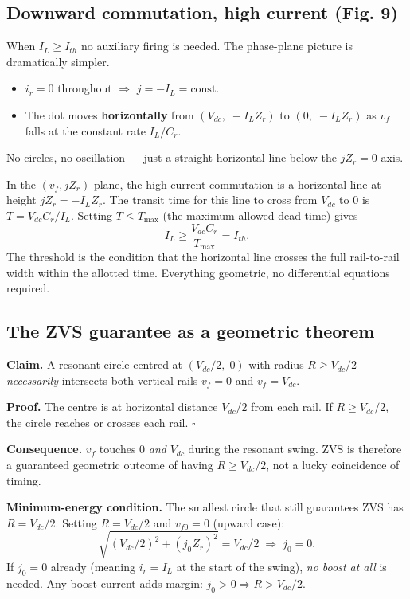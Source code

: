 \documentclass[12pt, a4paper]{article}
\def\,{ }%
\newcommand{\Vdc}{V_{dc}}
\newcommand{\ir}{i_r}
\newcommand{\IL}{I_L}
\newcommand{\Ith}{I_{th}}
\begin{document}
\subsection{Downward commutation, high current (Fig.\,9)}
\label{ssec:pp_fig9}

When $\IL \geq \Ith$ no auxiliary firing is needed.
The phase-plane picture is dramatically simpler.

\begin{itemize}
    \item $\ir = 0$ throughout $\Rightarrow$ $j = -\IL = \text{const}$.
    \item The dot moves \textbf{horizontally} from $(\Vdc,\; -\IL Z_r)$
          to $(0,\; -\IL Z_r)$ as $v_f$ falls at the constant rate
          $\IL/C_r$.
\end{itemize}

No circles, no oscillation --- just a straight horizontal line below the
$jZ_r = 0$ axis.

\begin{physbox}
In the $(v_f, jZ_r)$ plane, the high-current commutation is a horizontal
line at height $jZ_r = -\IL Z_r$.
The transit time for this line to cross from $\Vdc$ to $0$ is
$T = \Vdc C_r / \IL$.
Setting $T \leq T_\text{max}$ (the maximum allowed dead time) gives
\[
    \IL \geq \frac{\Vdc\,C_r}{T_\text{max}} = \Ith.
\]
The threshold is the condition that the horizontal line crosses the
full rail-to-rail width within the allotted time.
Everything geometric, no differential equations required.
\end{physbox}

\subsection{The ZVS guarantee as a geometric theorem}
\label{ssec:pp_zvs}

\begin{eqnbox}
\textbf{Claim.}
A resonant circle centred at $(\Vdc/2,\; 0)$ with radius $R \geq \Vdc/2$
\emph{necessarily} intersects both vertical rails $v_f = 0$ and
$v_f = \Vdc$.

\textbf{Proof.}
The centre is at horizontal distance $\Vdc/2$ from each rail.
If $R \geq \Vdc/2$, the circle reaches or crosses each rail. $\square$

\textbf{Consequence.}
$v_f$ touches 0 \emph{and} $\Vdc$ during the resonant swing.
ZVS is therefore a guaranteed geometric outcome of having
$R \geq \Vdc/2$, not a lucky coincidence of timing.

\textbf{Minimum-energy condition.}
The smallest circle that still guarantees ZVS has $R = \Vdc/2$.
Setting $R = \Vdc/2$ and $v_{f0} = 0$ (upward case):
\[
    \sqrt{(\Vdc/2)^2 + (j_0 Z_r)^2} = \Vdc/2
    \;\Rightarrow\; j_0 = 0.
\]
If $j_0 = 0$ already (meaning $\ir = \IL$ at the start of the swing),
\emph{no boost at all} is needed.
Any boost current adds margin: $j_0 > 0 \Rightarrow R > \Vdc/2$.
\end{eqnbox}
\end{document}
